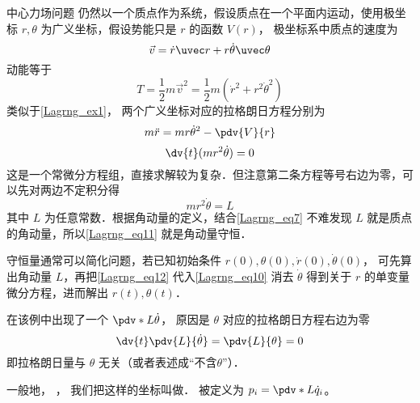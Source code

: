 \begin{exam}{中心力场问题}
仍然以一个质点作为系统，假设质点在一个平面内运动，使用极坐标 $r, \theta$ 为广义坐标，假设势能只是 $r$ 的函数 $V(r)$， 极坐标系中质点的速度为%
\begin{equation}\label{Lagrng_eq7}
\vec v = \dot r\uvec r + r\dot \theta \uvec \theta
\end{equation}
动能等于
\begin{equation}
T = \frac12 m\vec v^2 = \frac12 m(\dot r^2 + r^2 \dot \theta^2)
\end{equation}
类似于\autoref{Lagrng_ex1}， 两个广义坐标对应的拉格朗日方程分别为
\begin{equation}\label{Lagrng_eq10}
m\ddot r = mr \dot \theta^2 - \pdv{V}{r}
\end{equation}
\begin{equation}\label{Lagrng_eq11}
\dv{t} (m r^2\dot \theta)  = 0
\end{equation}
这是一个常微分方程组，直接求解较为复杂．但注意第二条方程等号右边为零，可以先对两边不定积分得
\begin{equation}\label{Lagrng_eq12}
mr^2\dot\theta = L
\end{equation}
其中 $L$ 为任意常数．根据角动量的定义，结合\autoref{Lagrng_eq7} 不难发现 $L$ 就是质点的角动量，所以\autoref{Lagrng_eq11} 就是角动量守恒．

守恒量通常可以简化问题，若已知初始条件 $r(0), \theta (0), \dot r(0), \dot\theta (0)$， 可先算出角动量 $L$，再把\autoref{Lagrng_eq12} 代入\autoref{Lagrng_eq10} 消去 $\dot\theta$ 得到关于 $r$ 的单变量微分方程，进而解出 $r(t), \theta (t)$．
\end{exam}

在该例中出现了一个 $\pdv*{L}{\dot\theta}$， 原因是 $\theta$ 对应的拉格朗日方程右边为零
\begin{equation}
\dv{t}\pdv{L}{\dot\theta} = \pdv{L}{\theta} = 0
\end{equation}
即拉格朗日量与 $\theta$ 无关（或者表述成“不含$\theta$”）．

一般地， ， 我们把这样的坐标叫做． 被定义为 $p_i = \pdv*{L}{\dot q_i}$。 

